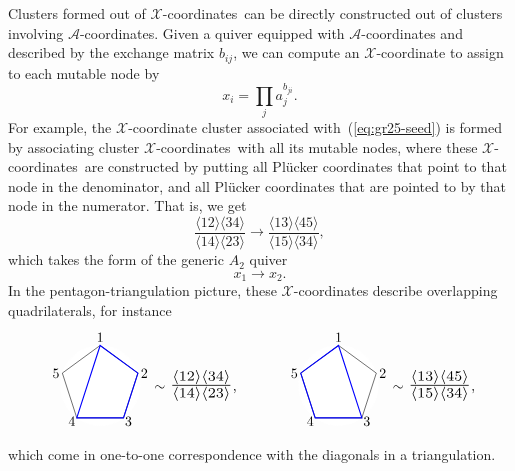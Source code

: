 \documentclass[11pt]{article}
\def\ket#1{\langle #1 \rangle}
\def\x{\mathcal{X}}
\def\xcoords{$\mathcal{X}$-coordinates}
\def\a{\mathcal{A}}
\def\acoords{$\mathcal{A}$-coordinates}
\def\drawLabeledPentagon{
\coordinate (P1) at (90:1);
\coordinate (P2) at (18:1);
\coordinate (P3) at (306:1);
\coordinate (P4) at (234:1);
\coordinate (P5) at (162:1);
\draw[white,fill=white] (0,0) circle (1cm);
\draw (P1) -- (P2) -- (P3) -- (P4) -- (P5) -- cycle;
\draw (0,1.2) node {1};
\draw (.9,.3) node[anchor=west] {2};
\draw (.5,-.9) node[anchor=west] {3};
\draw (-.5,-.9) node[anchor=east] {4};
\draw (-.9,.3) node[anchor=east] {5};
}
\begin{document}
Clusters formed out of \xcoords\ can be directly constructed out of clusters involving \acoords. Given a quiver equipped with $\a$-coordinates and described by the exchange matrix $b_{ij}$, we can compute an $\x$-coordinate to assign to each mutable node by
\begin{equation} \label{eq:x_from_a_coordinates}
	x_i = \prod_j a_j^{b_{ji}}. 	
\end{equation} 
For example, the $\x$-coordinate cluster associated with~(\ref{eq:gr25-seed}) is formed by associating cluster \xcoords\ with all its mutable nodes, where these \xcoords\ are constructed by putting all Pl\"ucker coordinates that point to that node in the denominator, and all Pl\"ucker coordinates that are pointed to by that node in the numerator. That is, we get
\begin{equation} \label{eq:a2_x_seed}
	\frac{\ket{12}\ket{34}}{\ket{14}\ket{23}} \to \frac{\ket{13}\ket{45}}{\ket{15}\ket{34}},
\end{equation}
which takes the form of the generic $A_2$ quiver
\begin{equation} \label{def:xcoordsA2}
	x_1 \to x_2.
\end{equation}
In the pentagon-triangulation picture, these $\x$-coordinates describe overlapping quadrilaterals, for instance
\begin{equation}
\begin{gathered}
 {\hspace{-.8cm}}
\begin{tikzpicture}
  \drawLabeledPentagon
  \draw[color=blue, thick] (P1) -- (P2) -- (P3) -- (P4) -- cycle;
  \draw (2,0) node {\hspace{.8cm}$\sim$ \scalebox{1.44}{$\frac{\ket{12}\ket{34}}{\ket{14}\ket{23}}$},}; {\hspace{1cm}}
\begin{scope}[xshift = 5cm]
  \drawLabeledPentagon
  \draw[color=blue, thick] (P1) -- (P3) -- (P4) -- (P5) -- cycle;
  \draw (2,0) node {\hspace{.8cm}$\sim$ \scalebox{1.44}{$\frac{\ket{13}\ket{45}}{\ket{15}\ket{34}}$},};
\end{scope}
\end{tikzpicture} 
\end{gathered}
\end{equation}
which come in one-to-one correspondence with the diagonals in a triangulation.
\end{document}
